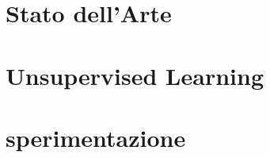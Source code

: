 \documentclass[a4paper,12pt,oneside]{book}
\begin{document}
\chapter{Stato dell'Arte}
\label{cap:capitolo1}

\chapter{Unsupervised Learning}
\label{cap:capitolo2}

\chapter{sperimentazione}
\label{cap:capitolo4}



%
%
%

\end{document}
